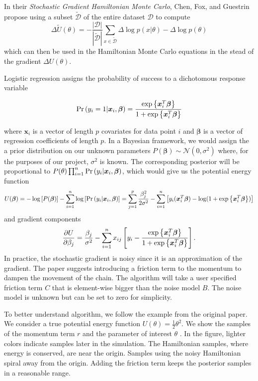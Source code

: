 In their \textit{Stochastic Gradient Hamiltonian Monte Carlo}, Chen, Fox, and Guestrin propose using a subset $\tilde{\mathcal{D}}$ of the entire dataset $\mathcal{D}$ to compute
\begin{equation*}
	\Delta\tilde{U}(\theta)=-\frac{|\mathcal{D}|}{|\tilde{\mathcal{D}}|}\sum_{x\in\tilde{\mathcal{D}}}\Delta\log p(x|\theta) - \Delta\log p(\theta)
\end{equation*}
which can then be used in the Hamiltonian Monte Carlo equations in the stead of the gradient $\Delta U(\theta)$.

Logistic regression assigns the probability of success to a dichotomous response variable

\begin{equation*}
	\mathrm{Pr}\left(y_i=1|\bm{x}_{i},\bm{\beta}\right)=\frac{\exp\left\lbrace\bm{x}_i^T\bm{\beta} \right\rbrace}{1+\exp\left\lbrace\bm{x}_i^T\bm{\beta} \right\rbrace}
\end{equation*}

where $\bm{x}_i$ is a vector of length $p$ covariates for data point $i$ and $\bm{\beta}$ is a vector of regression coefficients of length $p$. In a Bayesian framework, we would assign the a prior distribution on our unknown parameters $P(\bm{\beta})\sim\mathcal{N}(0, \sigma^2)$ where, for the purposes of our project, $\sigma^2$ is known. The corresponding posterior will be proportional to $P(\theta)\prod_{i=1}^n\mathrm{Pr}\left(y_i|\bm{x}_i,\bm{\beta}\right)$, which would give us the potential energy function
\begin{equation*}
U(\bm{\beta})=-\log\left[P(\bm{\beta})\right] - \sum_{i=1}^n\log\left[\mathrm{Pr}\left(y_i|\bm{x}_i,\bm{\beta}\right)\right]=\sum_{j=1}^p\frac{\beta_j^2}{2\sigma^2}-\sum_{i=1}^n\left[y_i(\bm{x}_i^T\bm{\beta})-\log(1+\exp\left\lbrace\bm{x}_i^T\bm{\beta} \right\rbrace)\right]
\end{equation*}
and gradient components
\begin{equation*}
\frac{\partial U}{\partial \beta_j}=\frac{\beta_j}{\sigma^2}-\sum_{i=1}^{n}x_{ij}\left[y_i-\frac{\exp\left\lbrace\bm{x}_i^T\bm{\beta} \right\rbrace}{1+\exp\left\lbrace\bm{x}_i^T\bm{\beta} \right\rbrace}\right]. 
\end{equation*}
In practice, the stochastic gradient is noisy since it is an approximation of the gradient. The paper suggests introducing a friction term to the momentum to dampen the movement of the chain. The algorithm will take a user specified friction term $C$ that is element-wise bigger than the noise model $B$. The noise model is unknown but can be set to zero for simplicity. 

To better understand algorithm, we follow the example from the original paper. We consider a true potential energy function $U(\theta)=\frac{1}{2}\theta^2$. We show the samples of the momentum term  $r$ and the parameter of interest  $\theta$ . In the figure, lighter colors indicate samples later in the simulation. The Hamiltonian samples, where energy is conserved, are near the origin. Samples using the noisy Hamiltonian spiral away from the origin. Adding the friction term keeps the posterior samples in a reasonable range.

